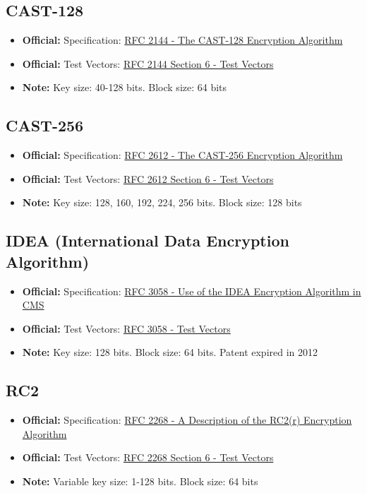 \documentclass[12pt,a4paper]{article}
\newcommand{\official}[1]{\textcolor{citegreen}{\textbf{Official:}} #1}
\newcommand{\note}[1]{\textcolor{noteorange}{\textbf{Note:}} #1}
\newcommand{\link}[2]{\href{#1}{#2}}
\begin{document}
\subsection{CAST-128}
\begin{itemize}
    \item \official{Specification:} \link{https://tools.ietf.org/html/rfc2144}{RFC 2144 - The CAST-128 Encryption Algorithm}
    \item \official{Test Vectors:} \link{https://tools.ietf.org/html/rfc2144#section-6}{RFC 2144 Section 6 - Test Vectors}
    \item \note{Key size: 40-128 bits. Block size: 64 bits}
\end{itemize}

\subsection{CAST-256}
\begin{itemize}
    \item \official{Specification:} \link{https://tools.ietf.org/html/rfc2612}{RFC 2612 - The CAST-256 Encryption Algorithm}
    \item \official{Test Vectors:} \link{https://tools.ietf.org/html/rfc2612#section-6}{RFC 2612 Section 6 - Test Vectors}
    \item \note{Key size: 128, 160, 192, 224, 256 bits. Block size: 128 bits}
\end{itemize}

\subsection{IDEA (International Data Encryption Algorithm)}
\begin{itemize}
    \item \official{Specification:} \link{https://tools.ietf.org/html/rfc3058}{RFC 3058 - Use of the IDEA Encryption Algorithm in CMS}
    \item \official{Test Vectors:} \link{https://www.ietf.org/rfc/rfc3058.txt}{RFC 3058 - Test Vectors}
    \item \note{Key size: 128 bits. Block size: 64 bits. Patent expired in 2012}
\end{itemize}

\subsection{RC2}
\begin{itemize}
    \item \official{Specification:} \link{https://tools.ietf.org/html/rfc2268}{RFC 2268 - A Description of the RC2(r) Encryption Algorithm}
    \item \official{Test Vectors:} \link{https://tools.ietf.org/html/rfc2268#section-6}{RFC 2268 Section 6 - Test Vectors}
    \item \note{Variable key size: 1-128 bits. Block size: 64 bits}
\end{itemize}
\end{document}
